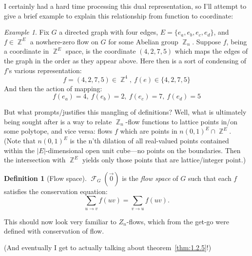 \documentclass{amsart}
\DeclareMathOperator{\Z}{\mathbb{Z}}
\DeclareMathOperator{\calF}{\mathcal{F}}
\theoremstyle{plain}
\theoremstyle{remark}
\newtheorem*{example*}{Example}
\theoremstyle{definition}
\newtheorem*{definition*}{Definition}
\newenvironment{example}%
	{\begin{leftbar}\begin{example*}
}{%
	\end{example*}\end{leftbar}
}
\newenvironment{definition}%
	{\begin{leftbar}\begin{definition*}
}{%
	\end{definition*}\end{leftbar}
}
\begin{document}
I certainly had a hard time processing this dual representation, so I'll
attempt to give a brief example to explain this relationship from function to
coordinate:
\begin{example}
  Fix $G$ a directed graph with four edges, $E=\{e_a,e_b,e_c,e_d\}$,
  and $f\in\Z^E$ a nowhere-zero flow on $G$ for some Abelian group $\Z_n$.
  Suppose $f$, being a coordinate in $\Z^E$ space,
  is the coordinate $(4,2,7,5)$ which maps the edges of the graph in the order
  as they appear above.
  Here then is a sort of condensing of $f$'s various representation:
  \[
    f=(4,2,7,5)\in\Z^4,~f(e)\in\{4,2,7,5\}
  \]
	And then the action of mapping:
  \[
    f(e_a)=4,~f(e_b)=2,~f(e_c)=7,~f(e_d)=5
  \]
\end{example}
But what prompts/justifies this mangling of definitions?
Well, what is ultimately being sought after is a way to relate $\Z_n$-flow
functions to lattice points in/on some polytope, and vice versa:
%
flows $f$ which are points in $n{(0,1)}^E\cap \Z^E$.
(Note that $n{(0,1)}^E$ is the n'th dilation of all real-valued points contained
within the ${\lvert E\rvert}$-dimensional open unit cube---no points on the
boundaries. Then the intersection with $\Z^E$ yields only those points that are
lattice/integer point.)

\begin{definition}[Flow space]
  $\calF_G(\vec 0)$ is the \emph{flow space} of $G$ such that each $f$
  satisfies the conservation equation:
  \[
    \sum_{u\to v}f(uv)=\sum_{v\to u}f(uv).
  \] 
\end{definition}
This should now look very familiar to $Z_n$-flows, which from the get-go were
defined with conservation of flow.

(And eventually I get to actually talking about theorem~\ref{thm:1.2.5}!)

%
%
%
\end{document}
